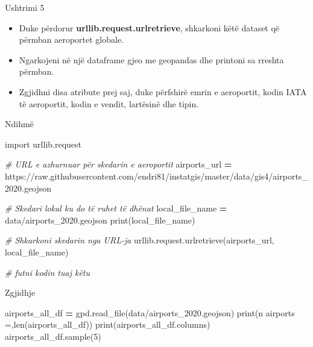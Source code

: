 \documentclass[
  ignorenonframetext,
]{beamer}
\newenvironment{Shaded}{\begin{snugshade}}{\end{snugshade}}
\newcommand{\BuiltInTok}[1]{#1}
\newcommand{\CommentTok}[1]{\textcolor[rgb]{0.56,0.35,0.01}{\textit{#1}}}
\newcommand{\DecValTok}[1]{\textcolor[rgb]{0.00,0.00,0.81}{#1}}
\newcommand{\ImportTok}[1]{#1}
\newcommand{\NormalTok}[1]{#1}
\newcommand{\OperatorTok}[1]{\textcolor[rgb]{0.81,0.36,0.00}{\textbf{#1}}}
\newcommand{\StringTok}[1]{\textcolor[rgb]{0.31,0.60,0.02}{#1}}
\begin{document}
\begin{frame}{Ushtrimi 5}
\protect\hypertarget{ushtrimi-5}{}
\begin{itemize}
\item
  Duke përdorur \textbf{urllib.request.urlretrieve}, shkarkoni këtë
  dataset që përmban aeroportet globale.
\item
  Ngarkojeni në një dataframe gjeo me geopandas dhe printoni sa rreshta
  përmban.
\item
  Zgjidhni disa atribute prej saj, duke përfshirë emrin e aeroportit,
  kodin IATA të aeroportit, kodin e vendit, lartësinë dhe tipin.
\end{itemize}
\end{frame}

\begin{frame}[fragile]{Ndihmë}
\protect\hypertarget{ndihmuxeb-3}{}

\begin{Shaded}
\begin{Highlighting}[]
\ImportTok{import}\NormalTok{ urllib.request}

\CommentTok{\# URL e azhurnuar për skedarin e aeroportit}
\NormalTok{airports\_url }\OperatorTok{=} \StringTok{\textquotesingle{}https://raw.githubusercontent.com/endri81/instatgis/master/data/gis4/airports\_2020.geojson\textquotesingle{}}

\CommentTok{\# Skedari lokal ku do të ruhet të dhënat}
\NormalTok{local\_file\_name }\OperatorTok{=} \StringTok{\textquotesingle{}data/airports\_2020.geojson\textquotesingle{}}
\BuiltInTok{print}\NormalTok{(local\_file\_name)}

\CommentTok{\# Shkarkoni skedarin nga URL{-}ja}
\NormalTok{urllib.request.urlretrieve(airports\_url, local\_file\_name)}

\CommentTok{\# futni kodin tuaj këtu}
\end{Highlighting}
\end{Shaded}
\end{frame}

\begin{frame}[fragile]{Zgjidhje}
\protect\hypertarget{zgjidhje-18}{}

\begin{Shaded}
\begin{Highlighting}[]
\NormalTok{airports\_all\_df }\OperatorTok{=}\NormalTok{ gpd.read\_file(}\StringTok{\textquotesingle{}data/airports\_2020.geojson\textquotesingle{}}\NormalTok{)}
\BuiltInTok{print}\NormalTok{(}\StringTok{\textquotesingle{}n airports =\textquotesingle{}}\NormalTok{,}\BuiltInTok{len}\NormalTok{(airports\_all\_df))}
\BuiltInTok{print}\NormalTok{(airports\_all\_df.columns)}
\NormalTok{airports\_all\_df.sample(}\DecValTok{5}\NormalTok{)}
\end{Highlighting}
\end{Shaded}
\end{frame}
\end{document}
